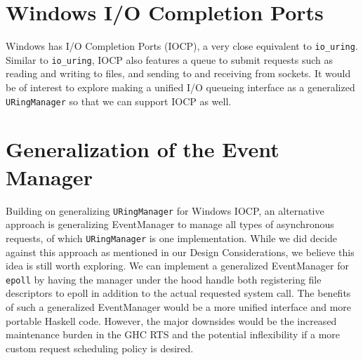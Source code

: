 \section{Windows I/O Completion Ports} 
Windows has I/O Completion Ports (IOCP), a very close equivalent to \texttt{io\_uring}. Similar to \texttt{io\_uring}, IOCP also features a queue to submit requests such as reading and writing to files, and sending to and receiving from sockets. It would be of interest to explore making a unified I/O queueing interface as a generalized \texttt{URingManager} so that we can support IOCP as well.

\section{Generalization of the Event Manager}
Building on generalizing \texttt{URingManager} for Windows IOCP, an alternative approach is generalizing
EventManager to manage all types of asynchronous requests, of which \texttt{URingManager} is one
implementation. While we did decide against this approach as mentioned in our Design Considerations,
we believe this idea is still worth exploring. We can implement a generalized EventManager for \texttt{epoll}
by having the manager under the hood handle both registering file descriptors to epoll in addition to
the actual requested system call. The benefits of such a generalized EventManager would be a more
unified interface and more portable Haskell code. However, the major downsides would be the
increased maintenance burden in the GHC RTS and the potential inflexibility if a more custom request scheduling policy is desired.
